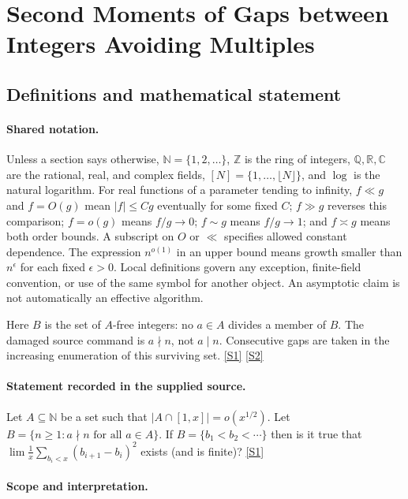 \documentclass[11pt,a4paper]{article}
\newcommand{\N}{\mathbb{N}}
\newcommand{\Z}{\mathbb{Z}}
\newcommand{\Q}{\mathbb{Q}}
\newcommand{\R}{\mathbb{R}}
\newcommand{\C}{\mathbb{C}}
\newcommand{\sref}[2]{\hyperlink{source:#1:#2}{[S#2]}}
\begin{document}
\section{Second Moments of Gaps between Integers Avoiding Multiples}\label{statement}


\subsection{Definitions and mathematical statement}

\paragraph{Shared notation.}Unless a section says otherwise, $\N=\{1,2,\ldots\}$,
$\Z$ is the ring of integers, $\Q,\R,\C$ are the rational, real, and complex
fields, $[N]=\{1,\ldots,\lfloor N\rfloor\}$, and $\log$ is the natural
logarithm. For real functions of a parameter tending to infinity,
$f\ll g$ and $f=O(g)$ mean $|f|\leq Cg$ eventually for some fixed $C$;
$f\gg g$ reverses this comparison; $f=o(g)$ means $f/g\to0$;
$f\sim g$ means $f/g\to1$; and $f\asymp g$ means both order bounds.
A subscript on $O$ or $\ll$ specifies allowed constant dependence.
The expression $n^{o(1)}$ in an upper bound means growth smaller than
$n^\epsilon$ for each fixed $\epsilon>0$. Local definitions govern any
exception, finite-field convention, or use of the same symbol for another
object. An asymptotic claim is not automatically an effective algorithm.



Here $B$ is the set of $A$-free integers: no $a\in A$ divides a member of $B$. The damaged source command is $a\nmid n$, not $a\mid n$. Consecutive gaps are taken in the increasing enumeration of this surviving set. \sref{statement}{1} \sref{statement}{2}

\paragraph{Statement recorded in the supplied source.}
Let $A\subseteq \mathbb{N}$ be a set such that $\lvert A\cap [1,x]\rvert=o(x^{1/2})$. Let $ B=\{ n\geq 1 : a\nmid n\textrm{ for all }a\in A\}. $ If $B=\{b_1<b_2<\cdots\}$ then is it true that $ \lim \frac{1}{x}\sum_{b_i<x}(b_{i+1}-b_i)^2 $ exists (and is finite)? \sref{statement}{1}

\paragraph{Scope and interpretation.}
\end{document}
